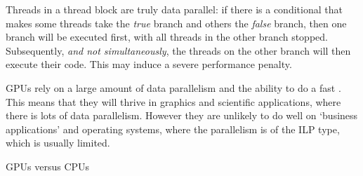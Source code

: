 \begin{comment}
\begin{quote}
\begin{tabular}{|c|cccc|}
  \toprule
     & SM & SP & thread blocks    & threads\\ \midrule
  GPU& 16 &    & $8\times 16=128$ & \\
  SM &    &  8 & 8                & 768 \\
  \bottomrule
\end{tabular}
\end{quote}
\end{comment}


\begin{comment}
The total internal bandwidth is about 80 Gbyte or 10 Gword per second,
or 100 Mword per \ac{SP}.
By contrast, the bandwidth to main memory (over the \indexterm{PCI-X bus}) is only
4 Gbyte per second, each way.
\end{comment}

Threads in a thread block are truly data parallel: if there is a
conditional that makes some threads take the \emph{true} branch and
others the \emph{false} branch, then one branch will be executed
first, with all threads in the other branch stopped. Subsequently,
\emph{and not simultaneously}, the threads on the other branch will
then execute their code. This may induce a severe performance penalty.

\acp{GPU} rely on a large amount of data parallelism and the ability to
do a fast
. This means that they will thrive in
graphics and scientific applications, where there is lots of data
parallelism. However they are unlikely to do well on `business
applications' and operating systems, where the parallelism is of the
\acf{ILP} type, which is usually limited.

 {GPUs versus CPUs}

